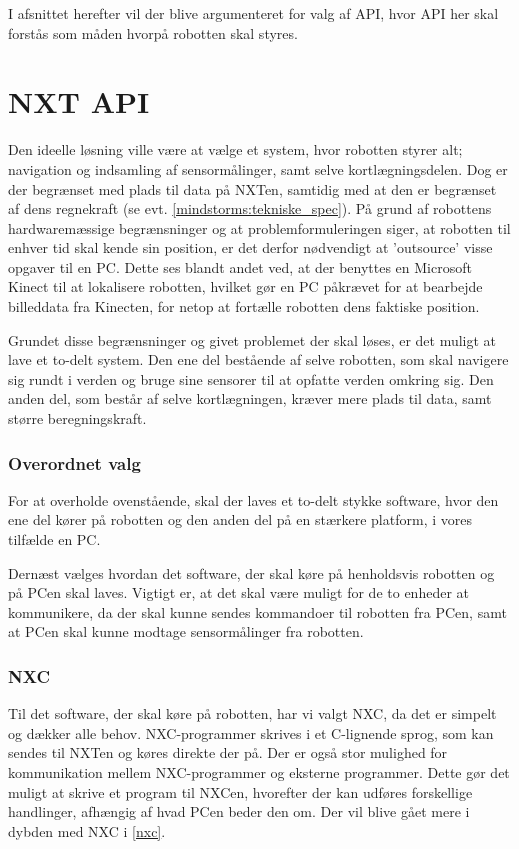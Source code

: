 I afsnittet herefter vil der blive argumenteret for valg af API, hvor API her skal forstås som måden hvorpå robotten skal styres.

\section{NXT API}\label{nxt_api}
Den ideelle løsning ville være at vælge et system, hvor robotten styrer alt; navigation og indsamling af sensormålinger, samt selve kortlægningsdelen.
Dog er der begrænset med plads til data på NXTen, samtidig med at den er begrænset af dens regnekraft (se evt. \cref{mindstorms:tekniske_spec}).
På grund af robottens hardwaremæssige begrænsninger og at problemformuleringen siger, at robotten til enhver tid skal kende sin position, er det derfor nødvendigt at 'outsource' visse opgaver til en PC.
Dette ses blandt andet ved, at der benyttes en Microsoft Kinect til at lokalisere robotten, hvilket gør en PC påkrævet for at bearbejde billeddata fra Kinecten, for netop at fortælle robotten dens faktiske position.

Grundet disse begrænsninger og givet problemet der skal løses, er det muligt at lave et to-delt system.
Den ene del bestående af selve robotten, som skal navigere sig rundt i verden og bruge sine sensorer til at opfatte verden omkring sig.
Den anden del, som består af selve kortlægningen, kræver mere plads til data, samt større beregningskraft.

\subsubsection*{Overordnet valg}
For at overholde ovenstående, skal der laves et to-delt stykke software, hvor den ene del kører på robotten og den anden del på en stærkere platform, i vores tilfælde en PC.

Dernæst vælges hvordan det software, der skal køre på henholdsvis robotten og på PCen skal laves.
Vigtigt er, at det skal være muligt for de to enheder at kommunikere, da der skal kunne sendes kommandoer til robotten fra PCen, samt at PCen skal kunne modtage sensormålinger fra robotten.
\subsubsection*{NXC}
Til det software, der skal køre på robotten, har vi valgt NXC, da det er simpelt og dækker alle behov.
NXC-programmer skrives i et C-lignende sprog, som kan sendes til NXTen og køres direkte der på.
Der er også stor mulighed for kommunikation mellem NXC-programmer og eksterne programmer.
Dette gør det muligt at skrive et program til NXCen, hvorefter der kan udføres forskellige handlinger, afhængig af hvad PCen beder den om.
Der vil blive gået mere i dybden med NXC i \cref{nxc}.

